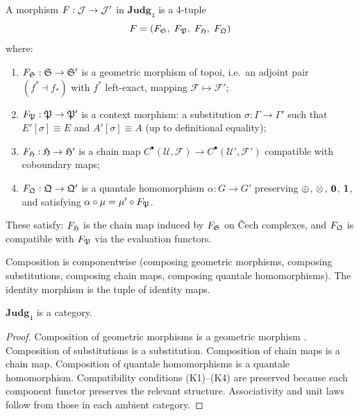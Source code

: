 \begin{definition}
\label{def:judg4-mor}
A morphism $F : \mathcal{J} \to \mathcal{J}'$ in $\mathbf{Judg}_4$ is a 4-tuple
\[
  F = (F_{\mathfrak{S}},\; F_{\mathfrak{P}},\; F_{\mathfrak{H}},\; F_{\mathfrak{Q}})
\]
where:
\begin{enumerate}[label=(\roman*),nosep]
\item $F_{\mathfrak{S}} : \mathfrak{S} \to \mathfrak{S}'$ is a geometric morphism of
  topoi, i.e.\ an adjoint pair $(f^* \dashv f_*)$ with $f^*$
  left-exact, mapping $\mathcal{F} \mapsto \mathcal{F}'$;
\item $F_{\mathfrak{P}} : \mathfrak{P} \to \mathfrak{P}'$ is a context morphism: a
  substitution $\sigma : \Gamma \to \Gamma'$ such that
  $E'[\sigma] \equiv E$ and $A'[\sigma] \equiv A$ (up to
  definitional equality);
\item $F_{\mathfrak{H}} : \mathfrak{H} \to \mathfrak{H}'$ is a chain map
  $C^\bullet(\mathcal{U}, \mathcal{F}) \to
  C^\bullet(\mathcal{U}', \mathcal{F}')$ compatible with coboundary maps;
\item $F_{\mathfrak{Q}} : \mathfrak{Q} \to \mathfrak{Q}'$ is a quantale homomorphism
  $\alpha : G \to G'$ preserving $\oplus$, $\otimes$, $\mathbf{0}$, $\mathbf{1}$,
  and satisfying $\alpha \circ \mu = \mu' \circ F_{\mathfrak{P}}$.
\end{enumerate}
These satisfy: $F_{\mathfrak{H}}$ is the chain map induced by $F_{\mathfrak{S}}$
on \v{C}ech complexes, and $F_{\mathfrak{Q}}$ is compatible with
$F_{\mathfrak{P}}$ via the evaluation functors.

Composition is componentwise (composing geometric morphisms, composing
substitutions, composing chain maps, composing quantale homomorphisms).
The identity morphism is the tuple of identity maps.
\end{definition}

\begin{lemma}
\label{lem:judg4-cat}
$\mathbf{Judg}_4$ is a category.
\end{lemma}

\begin{proof}
Composition of geometric morphisms is a geometric morphism
\cite{johnstone2002}.  Composition of substitutions is a substitution.
Composition of chain maps is a chain map.  Composition of quantale
homomorphisms is a quantale homomorphism.  Compatibility conditions
(K1)--(K4) are preserved because each component functor preserves the
relevant structure.  Associativity and unit laws follow from those in
each ambient category.
\end{proof}

